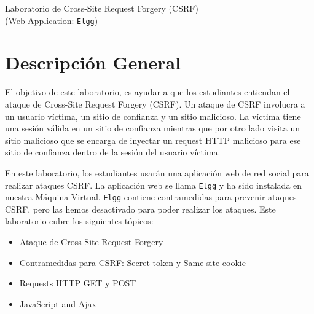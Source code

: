 
\newcommand{\commonfolder}{../../common-files}
\newcommand{\webcommon}{../Web_Common}








\begin{center}
{\LARGE Laboratorio de Cross-Site Request Forgery (CSRF)}
\vspace{0.1in}\\
{\Large (Web Application: {\tt Elgg})}
\end{center}




\section{Descripción General}


El objetivo de este laboratorio, es ayudar a que los estudiantes entiendan el ataque de Cross-Site Request Forgery (CSRF). Un ataque de CSRF involucra a un usuario víctima, un sitio de confianza y un sitio malicioso. La víctima tiene una sesión válida en un sitio de confianza mientras que por otro lado visita un sitio malicioso que se encarga de inyectar un request HTTP malicioso para ese sitio de confianza dentro de la sesión del usuario víctima.

En este laboratorio, los estudiantes usarán una aplicación web de red social para realizar ataques CSRF. La aplicación web se llama \texttt{Elgg} y ha sido instalada en nuestra Máquina Virtual. 
\texttt{Elgg} contiene contramedidas para prevenir ataques CSRF, pero las hemos desactivado para poder realizar los ataques.
Este laboratorio cubre los siguientes tópicos:


\begin{itemize}[noitemsep]
 \item Ataque de Cross-Site Request Forgery 
 \item Contramedidas para CSRF: Secret token y Same-site cookie
 \item Requests HTTP GET y POST
 \item JavaScript and Ajax
\end{itemize}



